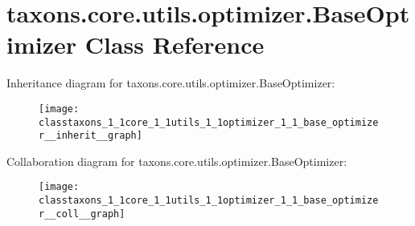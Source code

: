 \hypertarget{classtaxons_1_1core_1_1utils_1_1optimizer_1_1_base_optimizer}{}\section{taxons.\+core.\+utils.\+optimizer.\+Base\+Optimizer Class Reference}
\label{classtaxons_1_1core_1_1utils_1_1optimizer_1_1_base_optimizer}


Inheritance diagram for taxons.\+core.\+utils.\+optimizer.\+Base\+Optimizer\+:
\nopagebreak
\begin{figure}[H]
\begin{center}
\leavevmode
\texttt{[image: classtaxons\_1\_1core\_1\_1utils\_1\_1optimizer\_1\_1\_base\_optimizer\_\_inherit\_\_graph]}
\end{center}
\end{figure}


Collaboration diagram for taxons.\+core.\+utils.\+optimizer.\+Base\+Optimizer\+:
\nopagebreak
\begin{figure}[H]
\begin{center}
\leavevmode
\texttt{[image: classtaxons\_1\_1core\_1\_1utils\_1\_1optimizer\_1\_1\_base\_optimizer\_\_coll\_\_graph]}
\end{center}
\end{figure}
